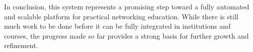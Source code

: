     In conclusion, this system represents a promising step toward a fully automated and scalable platform for practical 
    networking education. While there is still much work to be done before it can be fully integrated in institutions and courses, 
    the progress made so far provides a strong basis for further growth and refinement.




